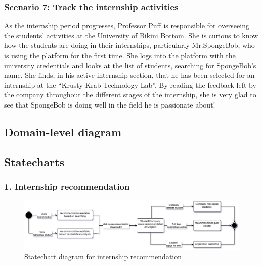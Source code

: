 \subsubsection{Scenario 7: Track the internship activities}\label{subsubsec:scenario_7}
As the internship period progresses, Professor Puff is responsible for overseeing the students' activities at the University of Bikini Bottom. 
She is curious to know how the students are doing in their internships, particularly Mr.SpongeBob, who is using the platform for the first time. 
She logs into the platform with the university credentials and looks at the list of students, searching for SpongeBob's name. She finds, 
in his active internship section, that he has been selected for an internship at the ``Krusty Krab Technology Lab''. By reading the feedback 
left by the company throughout the different stages of the internship, she is very glad to see that SpongeBob is doing well in the field he is 
passionate about!


\subsection{Domain-level diagram}\label{subsec:domain_level_diagram}

\subsection{Statecharts}\label{subsec:statecharts}

\subsubsection{1. Internship recommendation}\label{subsubsec:internship_application}
\begin{figure}[H]
    \centering
    \includegraphics[width=1\textwidth]{Images/Internship_recommendation.png}
    \caption{Statechart diagram for internship recommendation}\label{fig:statechart_internship_recommendation}
\end{figure}

